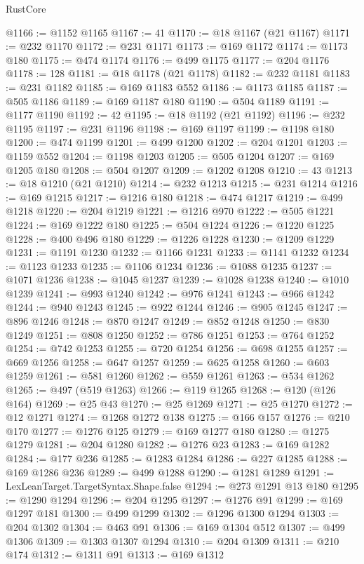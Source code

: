 \begin{lexlean}{RustCore}
\begin{coremodule}
@1166 := @1152 @1165
@1167 := 41
@1170 := @18 @1167 (@21 @1167)
@1171 := @232 @1170
@1172 := @231 @1171
@1173 := @169 @1172
@1174 := @1173 @180
@1175 := @474 @1174
@1176 := @499 @1175
@1177 := @204 @1176
@1178 := 128
@1181 := @18 @1178 (@21 @1178)
@1182 := @232 @1181
@1183 := @231 @1182
@1185 := @169 @1183 @552
@1186 := @1173 @1185
@1187 := @505 @1186
@1189 := @169 @1187 @180
@1190 := @504 @1189
@1191 := @1177 @1190
@1192 := 42
@1195 := @18 @1192 (@21 @1192)
@1196 := @232 @1195
@1197 := @231 @1196
@1198 := @169 @1197
@1199 := @1198 @180
@1200 := @474 @1199
@1201 := @499 @1200
@1202 := @204 @1201
@1203 := @1159 @552
@1204 := @1198 @1203
@1205 := @505 @1204
@1207 := @169 @1205 @180
@1208 := @504 @1207
@1209 := @1202 @1208
@1210 := 43
@1213 := @18 @1210 (@21 @1210)
@1214 := @232 @1213
@1215 := @231 @1214
@1216 := @169 @1215
@1217 := @1216 @180
@1218 := @474 @1217
@1219 := @499 @1218
@1220 := @204 @1219
@1221 := @1216 @970
@1222 := @505 @1221
@1224 := @169 @1222 @180
@1225 := @504 @1224
@1226 := @1220 @1225
@1228 := @400 @496 @180
@1229 := @1226 @1228
@1230 := @1209 @1229
@1231 := @1191 @1230
@1232 := @1166 @1231
@1233 := @1141 @1232
@1234 := @1123 @1233
@1235 := @1106 @1234
@1236 := @1088 @1235
@1237 := @1071 @1236
@1238 := @1045 @1237
@1239 := @1028 @1238
@1240 := @1010 @1239
@1241 := @993 @1240
@1242 := @976 @1241
@1243 := @966 @1242
@1244 := @940 @1243
@1245 := @922 @1244
@1246 := @905 @1245
@1247 := @896 @1246
@1248 := @870 @1247
@1249 := @852 @1248
@1250 := @830 @1249
@1251 := @808 @1250
@1252 := @786 @1251
@1253 := @764 @1252
@1254 := @742 @1253
@1255 := @720 @1254
@1256 := @698 @1255
@1257 := @669 @1256
@1258 := @647 @1257
@1259 := @625 @1258
@1260 := @603 @1259
@1261 := @581 @1260
@1262 := @559 @1261
@1263 := @534 @1262
@1265 := @497 (@519 @1263)
@1266 := @119 @1265
@1268 := @120 (@126 @164)
@1269 := @25 @43
@1270 := @25 @1269
@1271 := @25 @1270
@1272 := @12 @1271
@1274 := @1268 @1272 @138
@1275 := @166 @157
@1276 := @210 @170
@1277 := @1276 @125
@1279 := @169 @1277 @180
@1280 := @1275 @1279
@1281 := @204 @1280
@1282 := @1276 @23
@1283 := @169 @1282
@1284 := @177 @236
@1285 := @1283 @1284
@1286 := @227 @1285
@1288 := @169 @1286 @236
@1289 := @499 @1288
@1290 := @1281 @1289
@1291 := LexLeanTarget.TargetSyntax.Shape.false
@1294 := @273 @1291 @13 @180
@1295 := @1290 @1294
@1296 := @204 @1295
@1297 := @1276 @91
@1299 := @169 @1297 @181
@1300 := @499 @1299
@1302 := @1296 @1300 @1294
@1303 := @204 @1302
@1304 := @463 @91
@1306 := @169 @1304 @512
@1307 := @499 @1306
@1309 := @1303 @1307 @1294
@1310 := @204 @1309
@1311 := @210 @174
@1312 := @1311 @91
@1313 := @169 @1312

\end{coremodule}
\end{lexlean}
